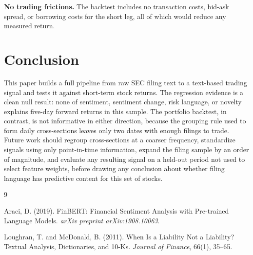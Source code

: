 \documentclass[11pt]{article}
\begin{document}
\textbf{No trading frictions.} The backtest includes no transaction costs, bid-ask spread, or borrowing costs for the short leg, all of which would reduce any measured return.

\section{Conclusion}

This paper builds a full pipeline from raw SEC filing text to a text-based trading signal and tests it against short-term stock returns. The regression evidence is a clean null result: none of sentiment, sentiment change, risk language, or novelty explains five-day forward returns in this sample. The portfolio backtest, in contrast, is not informative in either direction, because the grouping rule used to form daily cross-sections leaves only two dates with enough filings to trade. Future work should regroup cross-sections at a coarser frequency, standardize signals using only point-in-time information, expand the filing sample by an order of magnitude, and evaluate any resulting signal on a held-out period not used to select feature weights, before drawing any conclusion about whether filing language has predictive content for this set of stocks.

\begin{thebibliography}{9}

Araci, D. (2019). FinBERT: Financial Sentiment Analysis with Pre-trained Language Models. \textit{arXiv preprint arXiv:1908.10063}.

Loughran, T. and McDonald, B. (2011). When Is a Liability Not a Liability? Textual Analysis, Dictionaries, and 10-Ks. \textit{Journal of Finance}, 66(1), 35--65.

\end{thebibliography}
\end{document}
